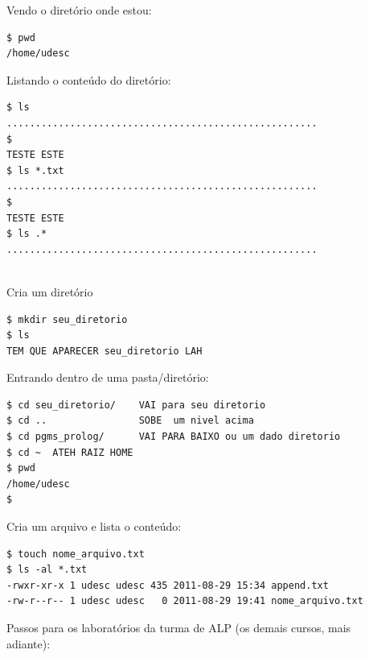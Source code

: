 \documentclass[final,a4paper]{article}
\begin{document}
\begin{description}


\item[] Vendo o diretório onde estou:
\begin{verbatim}
$ pwd
/home/udesc
\end{verbatim}


\pagebreak
\item[] Listando o conteúdo do diretório:
\begin{verbatim}
$ ls
......................................................
$ 
TESTE ESTE
$ ls *.txt
......................................................
$ 
TESTE ESTE
$ ls .*
......................................................


\end{verbatim}







\pagebreak
\item[] Cria um diretório
\begin{verbatim}
$ mkdir seu_diretorio
$ ls    
TEM QUE APARECER seu_diretorio LAH
\end{verbatim}


\pagebreak
\item[] Entrando dentro de uma pasta/diretório:
\begin{verbatim}
$ cd seu_diretorio/    VAI para seu diretorio
$ cd ..                SOBE  um nivel acima
$ cd pgms_prolog/      VAI PARA BAIXO ou um dado diretorio
$ cd ~  ATEH RAIZ HOME
$ pwd
/home/udesc
$ 
\end{verbatim}



\pagebreak
\item[] Cria um arquivo e lista o conteúdo:
\begin{verbatim}
$ touch nome_arquivo.txt
$ ls -al *.txt
-rwxr-xr-x 1 udesc udesc 435 2011-08-29 15:34 append.txt
-rw-r--r-- 1 udesc udesc   0 2011-08-29 19:41 nome_arquivo.txt
\end{verbatim}


\pagebreak
\item[] Passos para os laboratórios da turma de ALP (os demais cursos, mais adiante):


\begin{description}

 \setlength\itemsep{13pt}


\end{description}
\end{description}
\end{document}
